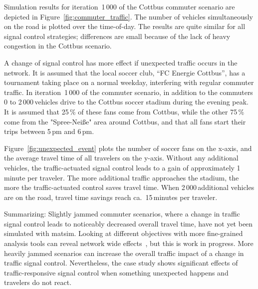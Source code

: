 Simulation results for iteration~1\,000 of the Cottbus commuter scenario are depicted in Figure~\ref{fig:commuter_traffic}. The number of vehicles simultaneously on the road is plotted over the time-of-day. The results are quite similar for all signal control strategies; differences are small because of the lack of heavy congestion in the Cottbus scenario. 

A change of signal control has more effect if unexpected traffic occurs in the network. It is assumed that the local soccer club, ``FC Energie Cottbus'', has a tournament taking place on a normal weekday, interfering with regular commuter traffic. In iteration~1\,000 of the commuter scenario, in addition to the commuters 0 to 2\,000\,vehicles drive to the Cottbus soccer stadium during the evening peak. It is assumed that 25\,\% of these fans come from Cottbus, while the other 75\,\% come from the "Spree-Nei{\ss}e" area around Cottbus, and that all fans start their trips between 5\,pm and 6\,pm. 

Figure~\ref{fig:unexpected_event} plots the number of soccer fans on the x-axis, and the average travel time of all travelers on the y-axis. Without any additional vehicles, the traffic-actuated signal control leads to a gain of approximately 1\,minute per traveler. The more additional traffic approaches the stadium, the more the traffic-actuated control saves travel time. When 2\,000\,additional vehicles are on the road, travel time savings reach ca.~15\,minutes per traveler. 

Summarizing: Slightly jammed commuter scenarios, where a change in traffic signal control leads to noticeably decreased overall travel time, have not yet been simulated with \gls{matsim}. Looking at different objectives with more fine-grained analysis tools can reveal network wide effects~\citep[\eg see the analysis using macroscopic fundamental diagrams][pp.114]{Grether2014PhD}, but this is work in progress. More heavily jammed scenarios can increase the overall traffic impact of a change in traffic signal control. Nevertheless, the case study shows significant effects of traffic-responsive signal control when something unexpected happens and travelers do not react.  

